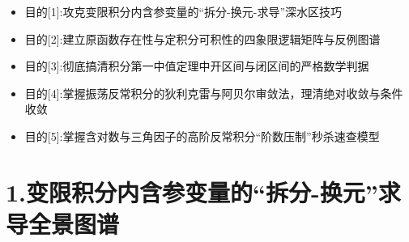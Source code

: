 \documentclass[11pt,a4paper,UTF8]{ctexart}
\begin{document}
\pagestyle{fancy}
\fancyhf{}
\fancyhead[R]{\small\color{TitlePurple}\nouppercase{\leftmark}}
\renewcommand{\headrulewidth}{0.5pt}

\tableofcontents
\newpage
{}


\begin{targetbox}[本章复习目标与核心知识图谱]
\begin{itemize}
  \item 目的[1]:攻克变限积分内含参变量的“拆分-换元-求导”深水区技巧
\end{itemize}
\end{targetbox}

\begin{targetbox}[本章复习目标与核心知识图谱]
\begin{itemize}
  \item 目的[2]:建立原函数存在性与定积分可积性的四象限逻辑矩阵与反例图谱
\end{itemize}
\end{targetbox}

\begin{targetbox}[本章复习目标与核心知识图谱]
\begin{itemize}
  \item 目的[3]:彻底搞清积分第一中值定理中开区间与闭区间的严格数学判据
\end{itemize}
\end{targetbox}

\begin{targetbox}[本章复习目标与核心知识图谱]
\begin{itemize}
  \item 目的[4]:掌握振荡反常积分的狄利克雷与阿贝尔审敛法，理清绝对收敛与条件收敛
\end{itemize}
\end{targetbox}

\begin{targetbox}[本章复习目标与核心知识图谱]
\begin{itemize}
  \item 目的[5]:掌握含对数与三角因子的高阶反常积分“阶数压制”秒杀速查模型
\end{itemize}
\end{targetbox}


\section{1.变限积分内含参变量的“拆分-换元”求导全景图谱}
\end{document}
